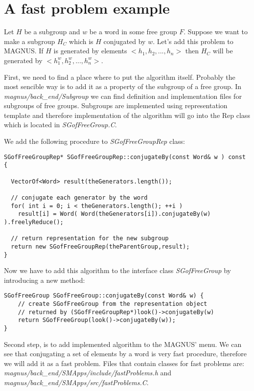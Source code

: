\documentclass[12pt]{article}
\begin{document}
\appendix
\section{A fast problem example}
Let $H$ be a subgroup and $w$ be a word in some free group $F$.
Suppose we want to make a subgroup $H_C$ which is $H$ conjugated by $w$.
Let's add this problem to MAGNUS. If $H$ is generated by elements
$<h_1, h_2, ..., h_n>$ then $H_C$ will be generated by $<h_1^w, h_2^w, ..., h_n^w>$.

First, we need to find a place where to put  the algorithm itself. 
Probably the most sencible way is to add it as a property of
the subgroup of a free group. In \emph{magnus/back\_end/Subgroup} we can find
definition and implementation files for subgroups of free groups.
Subgroups are implemented using representation template and therefore implementation
of the algorithm will go into the Rep class which is located in  \emph{SGofFreeGroup.C}.

We add the following procedure to \emph{SGofFreeGroupRep} class:

\footnotesize
\begin{verbatim}
SGofFreeGroupRep* SGofFreeGroupRep::conjugateBy(const Word& w ) const 
{
   
  VectorOf<Word> result(theGenerators.length());

  // conjugate each generator by the word
  for( int i = 0; i < theGenerators.length(); ++i ) 
    result[i] = Word( Word(theGenerators[i]).conjugateBy(w) ).freelyReduce();

  // return representation for the new subgroup
  return new SGofFreeGroupRep(theParentGroup,result);
}
\end{verbatim}
\normalsize

Now we have to add this algorithm to the interface class \emph{SGofFreeGroup}
by introducing a new method:
 
\footnotesize
\begin{verbatim}
SGofFreeGroup SGofFreeGroup::conjugateBy(const Word& w) {
    // create SGofFreeGroup from the representation object
    // returned by (SGofFreeGroupRep*)look()->conjugateBy(w)
    return SGofFreeGroup(look()->conjugateBy(w));
}
\end{verbatim}
\normalsize

Second step,  is to add implemented algorithm to the MAGNUS' menu.
We can see that conjugating a set of elements by a word is very
fast procedure, therefore we will add it as a fast problem.
Files that contain classes for fast problems are:
\emph{magnus/back\_end/SMApps/include/fastProblems.h} and \emph{magnus/back\_end/SMApps/src/fastProblems.C}.
\end{document}
